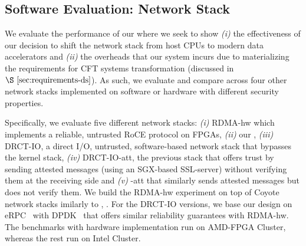 \subsection{Software Evaluation: \projecttitle{} Network Stack}\label{subsec:net_lib}

 We evaluate the performance of our \projecttitle{} where we seek to show {\em{(i)}} the effectiveness of our decision to shift the network stack from host CPUs to modern data accelerators and {\em{(ii)}} the overheads that our system incurs due to materializing the requirements for CFT systems transformation (discussed in $\S~\ref{sec:requirements-ds}$). As such, we evaluate and compare \projecttitle{} across four other network stacks implemented on software or hardware with different security properties. %

Specifically, we evaluate five different network stacks: {\em (i)} RDMA-hw which implements a reliable, untrusted RoCE protocol on FPGAs, {\em (ii)} our \projecttitle{}, {\em (iii)} DRCT-IO, a direct I/O, untrusted, software-based network stack that bypasses the kernel stack, {\em (iv)} DRCT-IO-att, the previous stack that offers trust by sending attested messages (using an SGX-based SSL-server) without verifying them at the receiving side and {\em (v)} \projecttitle{}-att that similarly sends attested messages but does not verify them. We build the RDMA-hw experiment on top of Coyote~\cite{coyote} network stacks imilarly to \projecttitle{}, . For the DRCT-IO versions, we base our design on eRPC~\cite{erpc} with DPDK~\cite{dpdk} that offers similar reliability guarantees with RDMA-hw. The benchmarks with hardware implementation run on AMD-FPGA Cluster, whereas the rest run on Intel Cluster.


